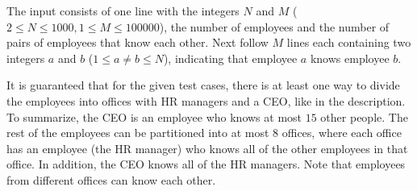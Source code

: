
The input consists of one line with the integers $N$ and $M$ ($2 \leq N \leq 1000, 1 \leq M \leq 100000$), 
the number of employees and the number of pairs of employees that know each other. 
Next follow $M$ lines each containing two integers $a$ and $b$ ($1\leq a\neq b \leq N$), indicating that 
employee $a$ knows employee $b$.

It is guaranteed that for the given test cases, there is at least one way to divide the employees into offices 
with HR managers and a CEO, like in the description. To summarize, the CEO is an employee who knows at most 
$15$ other people. The rest of the employees can be partitioned into at most $8$ offices, where each office
has an employee (the HR manager) who knows all of the other employees in that office. In addition, the CEO knows all of the HR managers.
Note that employees from different offices can know each other. 

